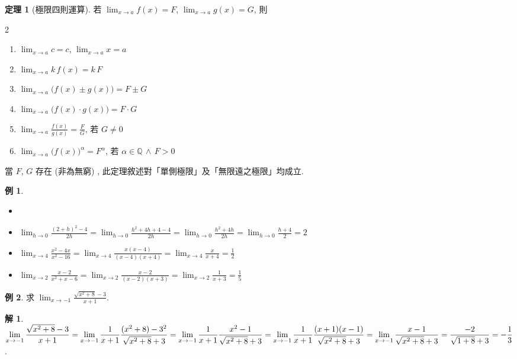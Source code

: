 \documentclass[12pt]{extarticle}
\newcommand{\ds}{\displaystyle}
\theoremstyle{definition}
\newtheorem*{thm}{定理}
\newtheorem*{ex}{例}
\newtheorem*{sol}{解}
\begin{document}
\begin{thm}[極限四則運算]
  若 $\ds\lim_{x\to a}f(x) = F$, $\ds\lim_{x\to a}g(x) = G$, 則
  \begin{multicols}{2}
    \begin{enumerate}\setlength\itemsep{0em}
      \item $\ds\lim_{x\to a} c = c$, $\ds\lim_{x\to a} x = a$
      \item $\ds\lim_{x\to a} k\,f(x) = k\,F$ 
      \item $\ds\lim_{x\to a} \big(f(x)\pm g(x)\big) = F\pm G$ 
      \item $\ds\lim_{x\to a} \big(f(x)\cdot g(x)\big) = F\cdot G$ 
      \item $\ds\lim_{x\to a} \frac{f(x)}{g(x)} = \frac{F}{G}$, 若 $G\ne 0$
      \item $\ds\lim_{x\to a} \big(f(x)\big)^\alpha = F^\alpha$, 若 $\alpha\in\mathbb{Q}\,\wedge\,F > 0$
    \end{enumerate}
  \end{multicols}
  當 $F$, $G$ 存在 (非為無窮) , 此定理敘述對「單側極限」及「無限遠之極限」均成立. 
\end{thm}

\begin{ex}
  \begin{itemize}\setlength\itemsep{0em}
    \item[]
    \item $\ds\lim_{h\to0}\frac{(2 + h)^2 - 4}{2 h} = \lim_{h\to0}\frac{h^2 + 4h + 4 - 4}{2 h} = \lim_{h\to0}\frac{h^2 + 4h}{2 h} =\lim_{h\to0}\frac{h + 4}{2} = 2$
    \item $\ds\lim_{x\to4}\frac{x^2 - 4x}{x^2 - 16} = \lim_{x\to4}\frac{x(x - 4)}{(x - 4)(x + 4)} = \lim_{x\to4}\frac{x}{x + 4} = \frac{1}{2}$
    \item $\ds\lim_{x\to 2}\frac{x - 2}{x^2 + x - 6} = \lim_{x\to 2}\frac{x - 2}{(x - 2)(x + 3)} = \lim_{x\to2}\frac{1}{x + 3} = \frac{1}{5}$
  \end{itemize}
\end{ex}

\begin{ex}
  求 $\ds\lim_{x\to-1}\frac{\sqrt{x^2 + 8} - 3}{x + 1}$. 
\end{ex}

\begin{sol}
  $\ds\lim_{x\to-1}\frac{\sqrt{x^2 + 8} - 3}{x + 1} = \lim_{x\to-1}\frac{1}{x + 1}\frac{(x^2 + 8) - 3^2}{\sqrt{x^2 + 8} + 3} = \lim_{x\to-1}\frac{1}{x + 1}\frac{x^2 - 1}{\sqrt{x^2 + 8} + 3} \\= \lim_{x\to-1}\frac{1}{x + 1}\frac{(x + 1)(x - 1)}{\sqrt{x^2 + 8} + 3} =\lim_{x\to-1}\frac{x - 1}{\sqrt{x^2 + 8} + 3} = \frac{-2}{\sqrt{1 + 8} + 3} = -\frac{1}{3}$. 
\end{sol}
\end{document}
